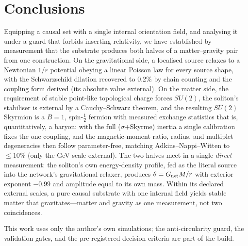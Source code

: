\documentclass[aps,prd,reprint,nofootinbib,superscriptaddress,floatfix]{revtex4-2}
\theoremstyle{plain}
\newcommand{\su}[1]{SU(#1)}
\begin{document}
\section{Conclusions}\label{sec:conclusions}

Equipping a causal set with a single internal orientation field, and analysing it
under a guard that forbids inserting relativity, we have established by measurement
that the substrate produces both halves of a matter--gravity pair from one
construction. On the gravitational side, a localised source relaxes to a Newtonian
$1/r$ potential obeying a linear Poisson law for every source shape, with the
Schwarzschild dilation recovered to $0.2\%$ by chain counting and the coupling form
derived (its absolute value external). On the matter side, the requirement of stable
point-like topological charge forces $\su2$, the soliton's stabiliser is external by a
Cauchy--Schwarz theorem, and the resulting $\su2$ Skyrmion is a $B=1$,
spin-$\tfrac12$ fermion with measured exchange statistics that is, quantitatively, a
baryon: with the full ($\sigma$+Skyrme) inertia a single calibration fixes the one
coupling, and the magnetic-moment ratio, radius, and multiplet degeneracies then follow
parameter-free, matching Adkins--Nappi--Witten to $\le10\%$ (only the GeV scale
external). The two halves meet in a single \emph{direct} measurement: the soliton's own
energy-density profile, fed as the literal source into the network's gravitational
relaxer, produces $\theta=G_{\rm net}M/r$ with exterior exponent $-0.99$ and amplitude
equal to its own mass. Within its declared external scales, a pure causal substrate with
one internal field yields stable matter that gravitates---matter and gravity as one
measurement, not two coincidences.

\begin{acknowledgments}
This work uses only the author's own simulations; the anti-circularity guard, the
validation gates, and the pre-registered decision criteria are part of the build.
\end{acknowledgments}



\end{document}
